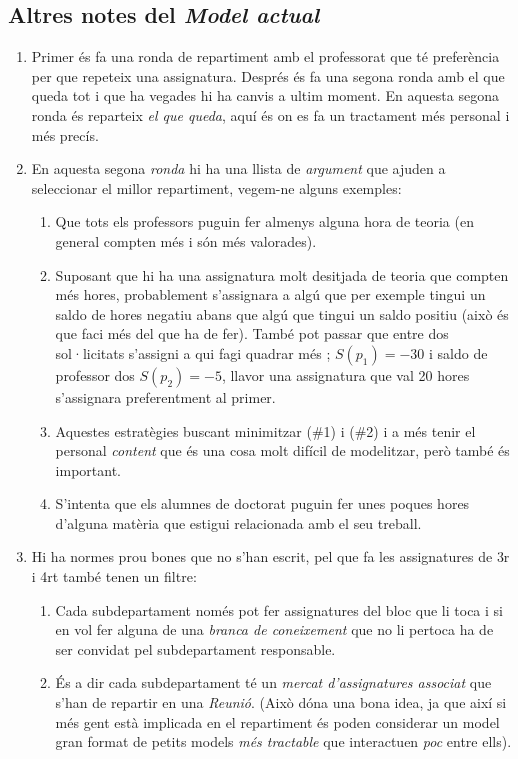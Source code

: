 \documentclass[10pt,twocolumn]{article}
\begin{document}
	\subsection{Altres notes del \textit{Model actual}}
	\begin{enumerate}
		\item Primer és fa una ronda de repartiment amb el professorat que té preferència per que repeteix una assignatura. Després és fa una segona ronda amb el que queda tot i que ha vegades hi ha canvis a ultim moment. En aquesta segona ronda és reparteix \textit{el que queda}, aquí  és on es fa un tractament més personal i més precís.
		\item En aquesta segona \textit{ronda} hi ha una llista de \textit{argument} que ajuden a seleccionar el millor repartiment, vegem-ne alguns exemples:
		\begin{enumerate}
			\item Que tots els professors puguin fer almenys alguna hora de teoria (en general compten més i són més valorades).
			\item Suposant que hi ha una assignatura molt desitjada de teoria que compten més hores, probablement s'assignara a algú que per exemple tingui un saldo de hores negatiu abans que algú que tingui un saldo positiu (això és que faci més del que ha de fer). També pot passar que entre dos sol·licitats s'assigni a qui fagi quadrar més ; $S(p_1)=-30$ i saldo de professor dos $S(p_2)=-5$, llavor una assignatura que val 20 hores s'assignara preferentment al primer.
			\item Aquestes estratègies buscant minimitzar (\#1) i (\#2) i a més tenir el personal \textit{content} que és una cosa molt difícil de modelitzar, però també és important.
			\item S'intenta que els alumnes de doctorat puguin fer unes poques hores d'alguna matèria que estigui relacionada amb el seu treball.
		\end{enumerate} 
		\item Hi ha normes prou bones que no s'han escrit, pel que fa les assignatures de 3r i 4rt  també tenen un filtre:
		\begin{enumerate}
			\item  Cada subdepartament només pot fer assignatures del bloc que li toca i si en vol fer alguna de una \textit{branca de coneixement} que no li pertoca ha de ser convidat pel subdepartament responsable.
			\item És a dir cada subdepartament té un \textit{mercat d'assignatures associat} que s'han de repartir en una \textit{Reunió}. (Això dóna una bona idea, ja que així si més gent està implicada en el repartiment és poden considerar un model gran format de petits models \textit{més tractable} que interactuen \textit{poc} entre ells).
			\end{enumerate}
		\end{enumerate}
\end{document}

